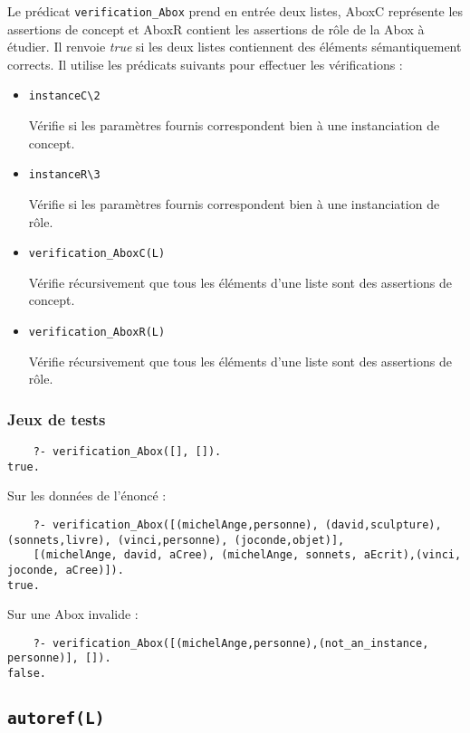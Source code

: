 \documentclass{article}
\newcommand{\code}[1]{\colorbox{light-gray}{\texttt{#1}}}
\begin{document}
Le prédicat \code{verification\_Abox} prend en entrée deux listes, AboxC représente les assertions de concept et AboxR contient les assertions de rôle de la Abox à étudier. Il renvoie \textit{true} si les deux listes contiennent des éléments sémantiquement corrects. Il utilise les prédicats suivants pour effectuer les vérifications :
\begin{itemize}
    \item \code{instanceC\textbackslash2}

    Vérifie si les paramètres fournis correspondent bien à une instanciation de concept.

    \item \code{instanceR\textbackslash3}

    Vérifie si les paramètres fournis correspondent bien à une instanciation de rôle.

    \item \code{verification\_AboxC(L)}

    Vérifie récursivement que tous les éléments d'une liste sont des assertions de concept.

    \item \code{verification\_AboxR(L)}
    
    Vérifie récursivement que tous les éléments d'une liste sont des assertions de rôle.
\end{itemize}

\subsubsection{Jeux de tests}
\begin{verbatim}
    ?- verification_Abox([], []).
true.
\end{verbatim}

Sur les données de l'énoncé :
\begin{verbatim}
    ?- verification_Abox([(michelAnge,personne), (david,sculpture), (sonnets,livre), (vinci,personne), (joconde,objet)], 
    [(michelAnge, david, aCree), (michelAnge, sonnets, aEcrit),(vinci, joconde, aCree)]).
true.
\end{verbatim}

Sur une Abox invalide :
\begin{verbatim}
    ?- verification_Abox([(michelAnge,personne),(not_an_instance, personne)], []).
false.
\end{verbatim}

\subsection{\code{autoref(L)}}
\end{document}
